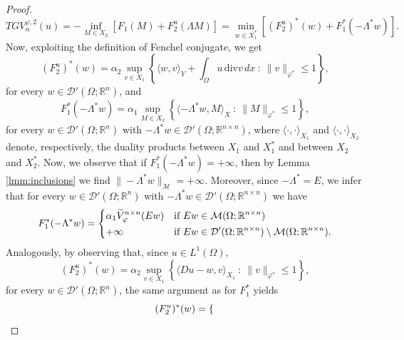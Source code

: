 \documentclass[a4paper,11pt,oneside,notitlepage]{article}
\numberwithin{equation}{section}
\def\R{\mathbb{R}}
\def\M{\mathcal{M}}
\renewcommand{\div}{\mathrm{div}}
\newcommand{\vphi}{\varphi}
\newcommand{\st}{ \ : \ }
\begin{document}
\begin{proof}
    \begin{equation*}
        TGV^{\vphi, 2}_\alpha(u)
        = -\inf_{M \in X_2} \left[F_1(M) + F_2^u(\Lambda M) \right]
        = \min_{w \in X_1^*} \left[ (F_2^u)^*(w) + F_1^*(-\Lambda^* w) \right].
    \end{equation*}
    Now, exploiting the definition of Fenchel conjugate, we get
    \begin{equation*}
        (F_2^u)^*(w) = \alpha_2 \sup_{v \in X_1} \left\{ \langle w , v \rangle_Y + \int_\Omega u \, \div v \, dx \st \|v\|_{\vphi^*} \le 1 \right\},
    \end{equation*}
    for every $w\in {\mathcal D}'(\Omega;\R^n)$, and
    \begin{equation*}
        F_1^*(-\Lambda^* w) = \alpha_1 \sup_{M \in X_2} \left\{ \langle -\Lambda^* w, M \rangle_X \st \|M\|_{\vphi^*} \le 1 \right\},
    \end{equation*}
    for every $w\in {\mathcal D}'(\Omega;\R^n)$ with $-\Lambda^* w \in {\mathcal D}'(\Omega;\R^{n \times n})$, where $\langle\cdot,\cdot\rangle_{X_1}$ and $\langle\cdot,\cdot\rangle_{X_2}$ denote, respectively, the duality products between $X_1$ and $X_1^*$ and between $X_2$ and $X_2^*$. Now, we observe that if $F_1^*(-\Lambda^* w) = +\infty$, then by Lemma \ref{lmm:inclusions} we find $\|-\Lambda^* w\|_\M = +\infty$. Moreover, since $-\Lambda^* = E$, we infer that for every $w\in {\mathcal D}'(\Omega;\R^n)$ with $-\Lambda^* w \in {\mathcal D}'(\Omega;\R^{n \times n})$ we have
    \begin{equation*}
        F_1^*(-\Lambda^* w) = 
        \begin{dcases} 
            \alpha_1 \widetilde{V}_\vphi^{n \times n}(E w) & \textnormal{if } E w\in \M (\Omega;\R^{n \times n}) \\
            +\infty & \textnormal{if } E w \in {\mathcal D}'(\Omega;\R^{n\times n}) \setminus \M(\Omega;\R^{n \times n}).
        \end{dcases}
    \end{equation*}
    Analogously, by observing that, since $u\in L^1(\Omega)$, 
    \begin{equation*}
        (F_2^u)^*(w) = \alpha_2 \sup_{v \in X_1} \left\{ \langle Du-w , v\rangle_{X_1} \st \|v\|_{\vphi^*} \le 1 \right\},
    \end{equation*}
    for every $w\in {\mathcal D}'(\Omega;\R^n)$, the same argument as for $F_1^*$ yields
    \begin{equation*}
        (F_2^u)^*(w) = 
        \begin{dcases} 

\end{dcases}
\end{equation*}
\end{proof}
\end{document}
